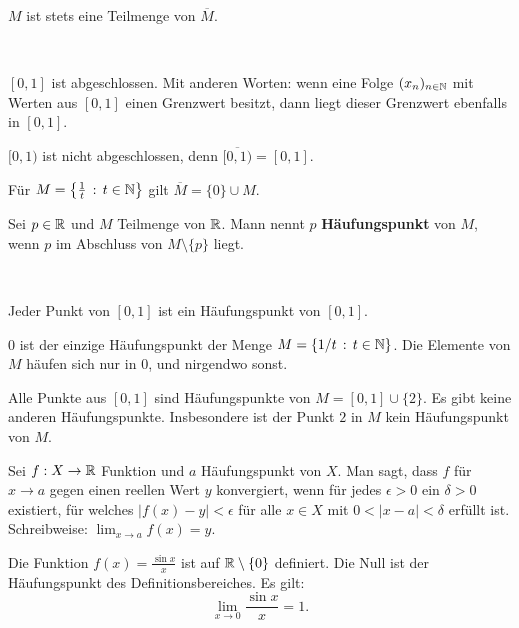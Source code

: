 \begin{bem} 
	$M$ ist stets eine Teilmenge von $\overline{M}$. 
\end{bem} 

\begin{bsp} {\ }
	\begin{enuma} 
		\item $[0,1]$ ist abgeschlossen. Mit anderen Worten: wenn eine Folge $(x_n)_{n \in \mathbb{N}}$ mit Werten aus $[0,1]$ einen Grenzwert besitzt, dann liegt dieser Grenzwert ebenfalls in $[0,1]$.  
		\item $[0,1)$ ist nicht abgeschlossen, denn $\overline{[0,1)} = [0,1]$. 
		\item Für $M = \left\{  \frac{1}{t}  \,:\, t \in \mathbb{N} \right\}$ gilt $\overline{M} = \{0\} \cup M$. 
	\end{enuma} 
\end{bsp} 

\begin{defn}
	Sei $p \in \mathbb{R}$ und $M$ Teilmenge von $\mathbb{R}$. Mann nennt $p$ \textbf{Häufungspunkt} von $M$, wenn $p$ im Abschluss von $M \setminus \{p\}$ liegt. 
\end{defn} 

\begin{bsp} {\ }
	\begin{enuma}
		\item Jeder Punkt von $[0,1]$ ist ein Häufungspunkt von $[0,1]$. 
		\item $0$ ist der einzige Häufungspunkt der Menge $M=\left\{ 1/t \,:\, t \in \mathbb{N} \right\}$. Die Elemente von $M$ häufen sich nur in $0$, und nirgendwo sonst. 
		\item Alle Punkte aus $[0,1]$ sind Häufungspunkte von $M = [0,1] \cup \{2\}$. Es gibt keine anderen Häufungspunkte. Insbesondere ist der Punkt $2$ in $M$ kein Häufungspunkt von $M$. 
	\end{enuma} 
\end{bsp} 

\begin{defn}
	Sei $f : X \to \mathbb{R}$ Funktion und $a$ Häufungspunkt von $X$. Man sagt, dass $f$ für $x \to a$ gegen einen reellen Wert $y$ konvergiert, wenn für jedes $\epsilon>0$ ein $\delta >0$ existiert, für welches $|f(x) -y| < \epsilon$ für alle $x \in X$ mit $0 < |x-a| < \delta$ erfüllt ist. Schreibweise: $\lim_{x \to a} f(x) = y$. 
\end{defn} 

\begin{bsp}
	Die Funktion $f(x) = \frac{\sin x}{x}$ ist auf $\mathbb{R} \setminus \{0\}$ definiert. Die Null ist der Häufungspunkt des Definitionsbereiches. Es gilt: 
	\[
		\lim_{x \to 0} \frac{\sin x}{x} = 1. 
	\]
\end{bsp} 

